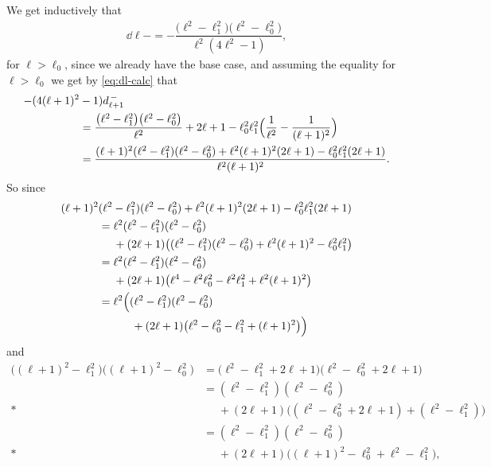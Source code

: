 We get inductively that
\begin{align*}
  \dd{\ell}{-} = -\dfrac{\bigl(\ell^2 - \ell_1^2\bigr)\bigl( \ell^2 - \ell_0^2 \bigr)}{\ell^2(4\ell^2-1)},
\end{align*}
for $\ell>\ell_0$, since we already have the base case, and assuming the equality for $\ell>\ell_0$ we get by \cref{eq:dl-calc} that
\begin{align*}
  -(4(\ell+1)^2&-1)d_{\ell+1}^{\,-} \\
  &= \dfrac{\bigl(\ell^2 - \ell_1^2\bigr)\bigl( \ell^2 - \ell_0^2 \bigr)}{\ell^2} + 2\ell+1 - \ell_0^2\ell_1^2\Bigl( \dfrac{1}{\ell^2} - \dfrac{1}{(\ell+1)^2} \Bigr) \\
  &= \dfrac{(\ell+1)^2(\ell^2-\ell_1^2)(\ell^2-\ell_0^2) + \ell^2(\ell+1)^2(2\ell+1) - \ell_0^2\ell_1^2(2\ell+1)}{\ell^2(\ell+1)^2}.
\end{align*}
So since
\begin{align*}
  (\ell+1)^2&(\ell^2-\ell_1^2)(\ell^2-\ell_0^2) + \ell^2(\ell+1)^2(2\ell+1) - \ell_0^2\ell_1^2(2\ell+1)\\
  &= \ell^2(\ell^2-\ell_1^2)(\ell^2-\ell_0^2) \\*
  &\phantom{{}={}}{} + (2\ell+1)\bigl( (\ell^2-\ell_1^2)(\ell^2-\ell_0^2) + \ell^2(\ell+1)^2 - \ell_0^2\ell_1^2 \bigr) \\
  &= \ell^2(\ell^2-\ell_1^2)(\ell^2-\ell_0^2) \\*
  &\phantom{{}={}}{} + (2\ell+1)\bigl( \ell^4 - \ell^2\ell_0^2 - \ell^2\ell_1^2+ \ell^2(\ell+1)^2 \bigr) \\
  &= \ell^2\Bigl((\ell^2-\ell_1^2)(\ell^2-\ell_0^2)\\*
  &\phantom{{}={}\ell^2()}{} + (2\ell+1)\bigl( \ell^2 - \ell_0^2 - \ell_1^2+(\ell+1)^2 \bigr) \Bigr) \\  
\end{align*}
and
\begin{align*}
  \bigl((\ell+1)^2-\ell_1^2\bigr)\bigl( (\ell+1)^2 - \ell_0^2\bigr) &= \bigl(\ell^2-\ell_1^2+2\ell+1 \bigr)\bigl( \ell^2-\ell_0^2 + 2\ell+1 \bigr) \\
                                                                    &= (\ell^2-\ell_1^2)(\ell^2-\ell_0^2) \\*
                                                                    &\phantom{{}={}}{} + (2\ell+1)\bigl( (\ell^2-\ell_0^2+2\ell+1) +  (\ell^2-\ell_1^2)  \bigr) \\
                                                                    &= (\ell^2-\ell_1^2)(\ell^2-\ell_0^2) \\*
                                                                    &\phantom{{}={}}{} + (2\ell+1)\bigl( (\ell+1)^2 -\ell_0^2 + \ell^2-\ell_1^2  \bigr),
\end{align*}
